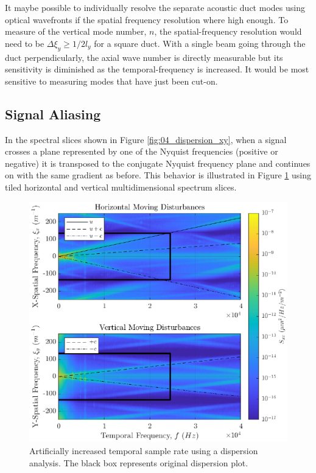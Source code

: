 It maybe possible to individually resolve the separate acoustic duct modes using optical wavefronts if the spatial frequency resolution where high enough.
To measure of the vertical mode number, $n$, the spatial-frequency resolution would need to be $\Delta\xi_y\ge 1/2l_y$ for a square duct.
With a single beam going through the duct perpendicularly, the axial wave number is directly measurable but its sensitivity is diminished as the temporal-frequency is increased.
It would be most sensitive to measuring modes that have just been cut-on.

\subsection{Signal Aliasing}
In the spectral slices shown in Figure \ref{fig:04_dispersion_xy}, when a signal crosses a plane represented by one of the Nyquist frequencies (positive or negative) it is transposed to the conjugate Nyquist frequency plane and continues on with the same gradient as before.
This behavior is illustrated in Figure \ref{fig:04_dispersion_supersample} using tiled horizontal and vertical multidimensional spectrum slices.
\begin{figure}
  \centering
  \includegraphics{../matlab/04_dispersion_analysis/dispersion_supersample.eps}
  \caption{Artificially increased temporal sample rate using a dispersion analysis. The black box represents original dispersion plot.}
  \label{fig:04_dispersion_supersample}
\end{figure}
